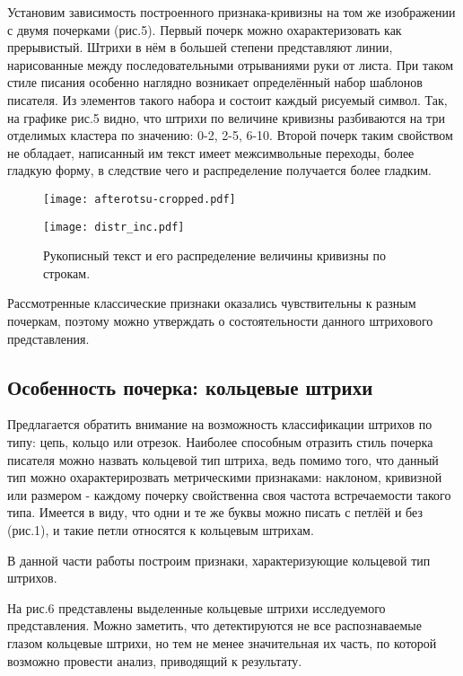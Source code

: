 \documentclass{article}
\begin{document}
Установим зависимость построенного признака-кривизны на том же изображении с двумя почерками (рис.5). Первый почерк можно охарактеризовать как прерывистый. Штрихи в нём в большей степени представляют линии, нарисованные между последовательными отрываниями руки от листа. При таком стиле писания особенно наглядно возникает определённый набор шаблонов писателя. Из элементов такого набора и состоит каждый рисуемый символ. Так, на графике рис.5 видно, что штрихи по величине кривизны разбиваются на три отделимых кластера по значению: 0-2, 2-5, 6-10. Второй почерк таким свойством не обладает, написанный им текст имеет межсимвольные переходы, более гладкую форму, в следствие чего и распределение получается более гладким.

\begin{figure}[h]
\begin{minipage}[h]{0.5\linewidth}
    \centering
    \texttt{[image: afterotsu-cropped.pdf]} 
\end{minipage}
\hfill
\begin{minipage}[h]{0.46\linewidth}
    \centering
    \texttt{[image: distr\_inc.pdf]}
\end{minipage}
\caption{Рукописный текст и его распределение величины кривизны по строкам.}
\end{figure}

Рассмотренные классические признаки оказались чувствительны к разным почеркам, поэтому можно утверждать о состоятельности данного штрихового представления.

\subsection{Особенность почерка: кольцевые штрихи}
Предлагается обратить внимание на возможность классификации штрихов по типу: цепь, кольцо или отрезок. Наиболее способным отразить стиль почерка писателя можно назвать кольцевой тип штриха, ведь помимо того, что данный тип можно охарактерирозвать метрическими признаками: наклоном, кривизной или размером - каждому почерку свойственна своя частота встречаемости такого типа. Имеется в виду, что одни и те же буквы можно писать с петлёй и без (рис.1), и такие петли относятся к кольцевым штрихам. 

В данной части работы построим признаки, характеризующие кольцевой тип штрихов. 

На рис.6 представлены выделенные кольцевые штрихи исследуемого представления. Можно заметить, что детектируются не все распознаваемые глазом кольцевые штрихи, но тем не менее значительная их часть, по которой возможно провести анализ, приводящий к результату.
\end{document}
